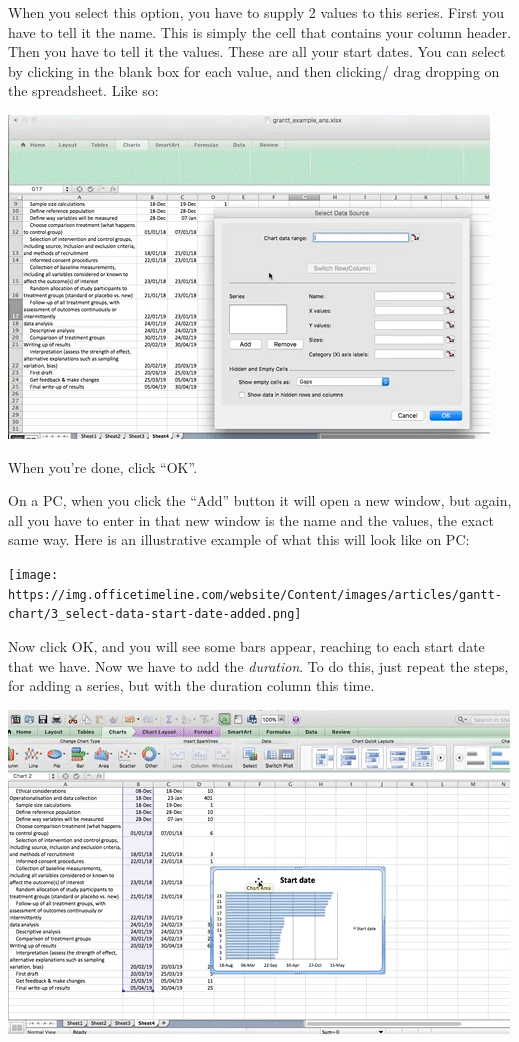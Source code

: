 \documentclass[
]{book}
\begin{document}
When you select this option, you have to supply 2 values to this series. First you have to tell it the name. This is simply the cell that contains your column header. Then you have to tell it the values. These are all your start dates. You can select by clicking in the blank box for each value, and then clicking/ drag dropping on the spreadsheet. Like so:

\includegraphics{imgs/gantt_select_data_1.gif}

When you're done, click ``OK''.

On a PC, when you click the ``Add'' button it will open a new window, but again, all you have to enter in that new window is the name and the values, the exact same way. Here is an illustrative example of what this will look like on PC:

\texttt{[image: https://img.officetimeline.com/website/Content/images/articles/gantt-chart/3\_select-data-start-date-added.png]}

Now click OK, and you will see some bars appear, reaching to each start date that we have. Now we have to add the \emph{duration}. To do this, just repeat the steps, for adding a series, but with the duration column this time.

\includegraphics{imgs/gantt_select_data_2.gif}
\end{document}
